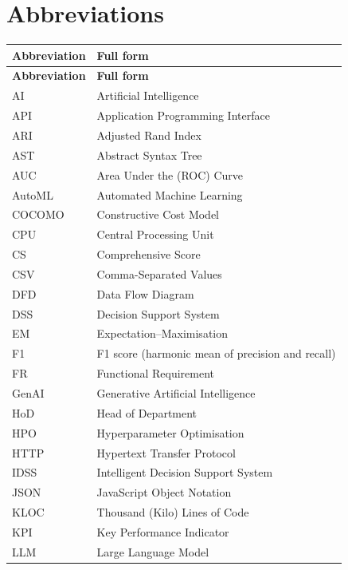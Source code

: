 \tableofcontents
\listoffigures
\listoftables

\chapter*{Abbreviations}
\begingroup
\linespread{1}\selectfont\renewcommand{\arraystretch}{1.25}
\begin{longtable}{@{}p{1.5in}p{\dimexpr\linewidth-1.5in-2\tabcolsep\relax}@{}}
\textbf{Abbreviation} & \textbf{Full form} \\[2pt]
\endfirsthead
\textbf{Abbreviation} & \textbf{Full form} \\[2pt]
\endhead
AI & Artificial Intelligence \\
API & Application Programming Interface \\
ARI & Adjusted Rand Index \\
AST & Abstract Syntax Tree \\
AUC & Area Under the (ROC) Curve \\
AutoML & Automated Machine Learning \\
COCOMO & Constructive Cost Model \\
CPU & Central Processing Unit \\
CS & Comprehensive Score \\
CSV & Comma-Separated Values \\
DFD & Data Flow Diagram \\
DSS & Decision Support System \\
EM & Expectation--Maximisation \\
F1 & F1 score (harmonic mean of precision and recall) \\
FR & Functional Requirement \\
GenAI & Generative Artificial Intelligence \\
HoD & Head of Department \\
HPO & Hyperparameter Optimisation \\
HTTP & Hypertext Transfer Protocol \\
IDSS & Intelligent Decision Support System \\
JSON & JavaScript Object Notation \\
KLOC & Thousand (Kilo) Lines of Code \\
KPI & Key Performance Indicator \\
LLM & Large Language Model \\

\end{longtable}
